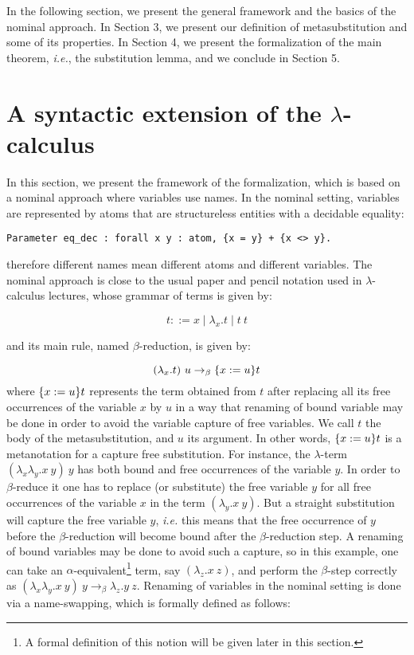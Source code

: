 In the following section, we present the general framework and the basics of the nominal approach. In Section 3, we present our definition of metasubstitution and some of its properties. In Section 4, we present the formalization of the main theorem, {\it i.e.}, the substitution lemma, and we conclude in Section 5.

\section{A syntactic extension of the $\lambda$-calculus}



 In this section, we present the framework of the formalization, which is based on a nominal approach \cite{gabbayNewApproachAbstract1999} where variables use names. In the nominal setting, variables are represented by atoms that are structureless entities with a decidable equality: 


\begin{verbatim}
Parameter eq_dec : forall x y : atom, {x = y} + {x <> y}.
\end{verbatim}


\noindent therefore different names mean different atoms and different variables. The nominal approach is close to the usual paper and pencil notation used in $\lambda$-calculus lectures, whose grammar of terms is given by:


\begin{equation}\label{lambda:grammar}
 t ::= x \mid \lambda_x.t \mid t\ t
\end{equation}


\noindent and its main rule, named $\beta$-reduction, is given by:


\begin{equation}\label{lambda:beta}
 (\lambda_x.t)\ u \to_{\beta} \metasub{t}{x}{u}
\end{equation}
\noindent where $\metasub{t}{x}{u}$ represents the term obtained from $t$ after replacing all its free occurrences of the variable $x$ by $u$ in a way that renaming of bound variable may be done in order to avoid the variable capture of free variables. We call $t$ the body of the metasubstitution, and $u$ its argument. In other words, $\metasub{t}{x}{u}$ is a metanotation for a capture free substitution. For instance, the $\lambda$-term $(\lambda_x\lambda_y.x\ y)\ y$ has both bound and free occurrences of the variable $y$. In order to $\beta$-reduce it one has to replace (or substitute) the free variable $y$ for all free occurrences of the variable $x$ in the term $(\lambda_y.x\ y)$. But a straight substitution will capture the free variable $y$, {\it i.e.} this means that the free occurrence of $y$ before the $\beta$-reduction will become bound after the $\beta$-reduction step. A renaming of bound variables may be done to avoid such a capture, so in this example, one can take an $\alpha$-equivalent\footnote{A formal definition of this notion will be given later in this section.} term, say $(\lambda_z.x\ z)$, and perform the $\beta$-step correctly as $(\lambda_x\lambda_y.x\ y)\ y \to_{\beta} \lambda_z.y\ z$. Renaming of variables in the nominal setting is done via a name-swapping, which is formally defined as follows:


